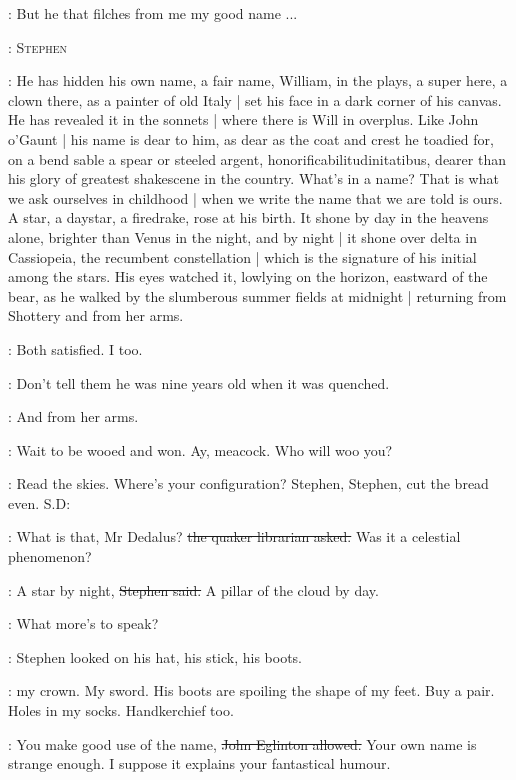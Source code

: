 \librarian:
But he that filches from me my good name ...

:
{\textsc{Stephen}}

\Stephen:
He has hidden his own name,
a fair name,
William,
in the plays,
a super here,
a clown there,
as a painter of old Italy |
set his face in a dark corner of his canvas.
He has revealed it in the sonnets |
where there is Will in overplus.
Like John o'Gaunt |
his name is dear to him,
as dear as the coat and crest he toadied for,
on a bend sable a spear or steeled argent,
honorificabilitudinitatibus,
dearer than his glory of greatest shakescene in the country.
What's in a name?
That is what we ask ourselves in childhood |
when we write the name that we are told is ours.
A star,
a daystar,
a firedrake,
rose at his birth.
It shone by day in the heavens alone,
brighter than Venus in the night,
and by night |
it shone over delta in Cassiopeia,
the recumbent constellation |
which is the signature of his initial among the stars.
His eyes watched it,
lowlying on the horizon,
eastward of the bear,
as he walked by the slumberous summer fields at midnight |
returning from Shottery and from her arms.

\StephenInt:
Both satisfied.
I too.

\StephenInt:
Don't tell them he was nine years old when it was quenched.

\StephenInt:
And from her arms.

\StephenInt:
Wait to be wooed and won.
Ay,
meacock.
Who will woo you?

\StephenInt:
Read the skies.
Where's your configuration?
Stephen,
Stephen,
cut the bread even.
S.D:

\librarian:
What is that,
Mr Dedalus?
\sout{the quaker librarian asked.}
Was it a celestial phenomenon?

\Stephen:
A star by night,
\sout{Stephen said.}
A pillar of the cloud by day.

\StephenInt:
What more's to speak?

:
Stephen looked on his hat,
his stick,
his boots.

\StephenInt:
my crown.
My sword.
His boots are spoiling the shape of my feet.
Buy a pair.
Holes in my socks.
Handkerchief too.

\eglinton:
You make good use of the name,
\sout{John Eglinton allowed.}
Your own name is strange enough.
I suppose it explains your fantastical humour.

